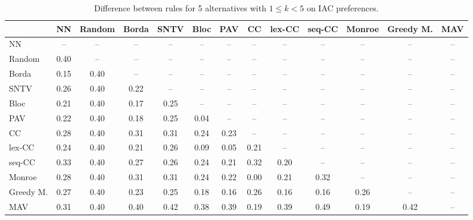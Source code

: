 
\begin{table*}[h!]
\centering
\begin{tabular}{lcccccccccccc}
\toprule
 & NN & Random & Borda & SNTV & Bloc & PAV & CC & lex-CC & seq-CC & Monroe & Greedy M. & MAV \\
\midrule
NN & -- & -- & -- & -- & -- & -- & -- & -- & -- & -- & -- & -- \\
Random & 0.40 & -- & -- & -- & -- & -- & -- & -- & -- & -- & -- & -- \\
Borda & 0.15 & 0.40 & -- & -- & -- & -- & -- & -- & -- & -- & -- & -- \\
SNTV & 0.26 & 0.40 & 0.22 & -- & -- & -- & -- & -- & -- & -- & -- & -- \\
Bloc & 0.21 & 0.40 & 0.17 & 0.25 & -- & -- & -- & -- & -- & -- & -- & -- \\
PAV & 0.22 & 0.40 & 0.18 & 0.25 & 0.04 & -- & -- & -- & -- & -- & -- & -- \\
CC & 0.28 & 0.40 & 0.31 & 0.31 & 0.24 & 0.23 & -- & -- & -- & -- & -- & -- \\
lex-CC & 0.24 & 0.40 & 0.21 & 0.26 & 0.09 & 0.05 & 0.21 & -- & -- & -- & -- & -- \\
seq-CC & 0.33 & 0.40 & 0.27 & 0.26 & 0.24 & 0.21 & 0.32 & 0.20 & -- & -- & -- & -- \\
Monroe & 0.28 & 0.40 & 0.31 & 0.31 & 0.24 & 0.22 & 0.00 & 0.21 & 0.32 & -- & -- & -- \\
Greedy M. & 0.27 & 0.40 & 0.23 & 0.25 & 0.18 & 0.16 & 0.26 & 0.16 & 0.16 & 0.26 & -- & -- \\
MAV & 0.31 & 0.40 & 0.40 & 0.42 & 0.38 & 0.39 & 0.19 & 0.39 & 0.49 & 0.19 & 0.42 & -- \\
\bottomrule
\end{tabular}

\caption{Difference between rules for 5 alternatives with $1 \leq k < 5$ on IAC preferences.}
\end{table*}
